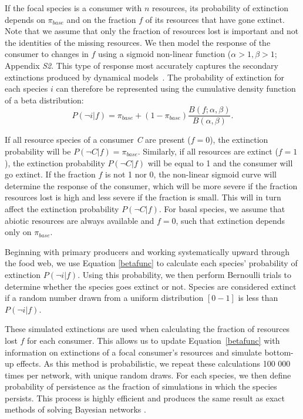 \documentclass[12pt]{article}
\begin{document}
\begin{spacing}{2.0}
        If the focal species is a consumer with $n$ resources, its probability of extinction depends on $\pi_{base}$ and on the fraction $f$ of its resources that have gone extinct.
        Note that we assume that only the fraction of resources lost is important and not the identities of the missing resources.
        We then model the response of the consumer to changes in $f$ using a sigmoid non-linear function ($\alpha > 1, \beta > 1$; Appendix \emph{S2}.
		This type of response most accurately captures the secondary extinctions produced by dynamical models~\citep{Eklof2013}.
		The probability of extinction for each species $i$ can therefore be represented using the cumulative density function of a beta distribution:
		\begin{equation}
		\label{betafunc}
		P(\lnot i|f) = \pi_{base} + (1 - \pi_{base}) \frac{B(f;\alpha,\beta)}{B(\alpha,\beta)}.
		\end{equation}
		
		If all resource species of a consumer \textit{C} are present ($f = 0$), the extinction probability will be $P(\lnot C|f) = \pi_{base}$. 
		Similarly, if all resources are extinct ($f = 1$), the extinction probability $P(\lnot C|f)$ will be equal to 1 and the consumer will go extinct.
		If the fraction $f$ is not 1 nor 0, the non-linear sigmoid curve will determine the response of the consumer, which will be more severe if the fraction resources lost is high and less severe if the fraction is small. This will in turn affect the extinction probability $P(\lnot C|f)$.
		For basal species, we assume that abiotic resources are always available and $f=0$, such that extinction depends only on $\pi_{base}$. 
		
		
        Beginning with primary producers and working systematically upward through the food web, we use Equation \ref{betafunc} to calculate each species' probability of extinction $P(\lnot i|f)$.
        Using this probability, we then perform Bernoulli trials to determine whether the species goes extinct or not. 
        Species are considered extinct if a random number drawn from a uniform distribution $[0-1]$ is less than $P(\lnot i|f)$.


        These simulated extinctions are used when calculating the fraction of resources lost $f$ for each consumer.
        This allows us to update Equation~\ref{betafunc} with information on extinctions of a focal consumer's resources and simulate bottom-up effects. As this method is probabilistic, we repeat these calculations 100 000 times per network, with unique random draws.
	    For each species, we then define probability of persistence as the fraction of simulations in which the species persists.
	    This process is highly efficient and produces the same result as exact methods of solving Bayesian networks \citep{Haussler2020}.
		

\end{spacing}
\end{document}
